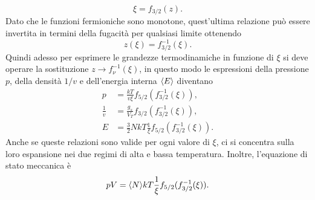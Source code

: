 \begin{equation}
    \xi = f_{3/2}(z).
\end{equation}
Dato che le funzioni fermioniche sono monotone, quest'ultima relazione può essere invertita in termini della fugacità per qualsiasi limite ottenendo
\begin{equation}
    z(\xi) = f_{3/2}^{-1}(\xi).
\end{equation}
Quindi adesso per esprimere le grandezze termodinamiche in funzione di $\xi$ si deve operare la sostituzione $z \to f^{-1}_\nu(\xi)$, in questo modo le espressioni della pressione $p$, della densità $1/v$ e dell'energia interna $\langle E \rangle$ diventano
\begin{align}
    p &= \frac{kT}{v\xi}f_{5/2}(f_{3/2}^{-1}(\xi)), \\ 
    \frac{1}{v} &= \frac{g_s}{V_T}f_{3/2}(f_{3/2}^{-1}(\xi)), \\
    E &= \frac{3}{2}NkT\frac{1}{\xi}f_{5/2}(f_{3/2}^{-1}(\xi)).
\end{align}
Anche se queste relazioni sono valide per ogni valore di $\xi$, ci si concentra sulla loro espansione nei due regimi di alta e bassa temperatura. Inoltre, l'equazione di stato meccanica è
\begin{equation}
\label{eq: equazione di stato meccanica gas fermioni liberi}
    pV = \langle N \rangle kT\frac{1}{\xi}f_{5/2}(f_{3/2}^{-1}(\xi)).
\end{equation}

